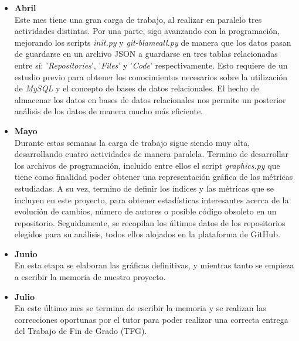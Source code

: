 \documentclass[a4paper, 12pt]{book}
\begin{document}
\begin{itemize}
  \item \textbf{Abril}
  \\Este mes tiene una gran carga de trabajo, al realizar en paralelo tres actividades distintas. Por una parte, sigo avanzando con la programación, mejorando los scripts \textit{init.py} y \textit{git-blameall.py}
  de manera que los datos pasan de guardarse en un archivo JSON a guardarse en tres tablas relacionadas entre sí: '\textit{Repositories}', '\textit{Files}' y '\textit{Code}' respectivamente.
  Esto requiere de un estudio previo para obtener los conocimientos necesarios sobre la utilización de \textit{MySQL} y el concepto de bases de datos relacionales. El hecho de almacenar los datos en bases de datos
  relacionales nos permite un posterior análisis de los datos de manera mucho más eficiente.

  \item \textbf{Mayo}
  \\Durante estas semanas la carga de trabajo sigue siendo muy alta, desarrollando cuatro actividades de manera paralela. Termino de desarrollar los archivos de programación, incluido entre ellos el script \textit{graphics.py}
  que tiene como finalidad poder obtener una representación gráfica de las métricas estudiadas. A su vez, termino de definir los índices y las métricas que se incluyen en este proyecto, para obtener estadísticas interesantes
  acerca de la evolución de cambios, número de autores o posible código obsoleto en un repositorio. Seguidamente, se recopilan los últimos datos de los repositorios elegidos para su análisis, todos ellos alojados en la plataforma
  de GitHub.

  \item \textbf{Junio}
  \\En esta etapa se elaboran las gráficas definitivas, y mientras tanto se empieza a escribir la memoria de nuestro proyecto.

  \item \textbf{Julio}
  \\En este último mes se termina de escribir la memoria y se realizan las correcciones oportunas por el tutor para poder realizar una correcta entrega del Trabajo de Fin de Grado (TFG).

\end{itemize}


\end{document}
